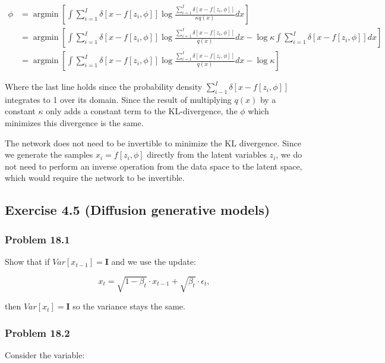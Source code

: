 \documentclass[
10pt, %
a4paper, %
oneside, %
headinclude,footinclude, %
BCOR5mm, %
]{scrartcl}
\DeclareMathOperator*{\argmin}{argmin} %
\begin{document}
\begin{align*}
  \phi &= \argmin \left[ \int \sum_{i=1}^I \delta[x-f[z_i,\phi]] \log \frac{\sum_{i=1}^I \delta[x-f[z_i,\phi]]}{\kappa q(x)} dx \right] \\
  &= \argmin \left[ \int \sum_{i=1}^I \delta[x-f[z_i,\phi]] \log \frac{\sum_{i=1}^I \delta[x-f[z_i,\phi]]}{q(x)} dx - \log \kappa \int \sum_{i=1}^I \delta[x-f[z_i,\phi]] dx \right] \\
  &= \argmin \left[ \int \sum_{i=1}^I \delta[x-f[z_i,\phi]] \log \frac{\sum_{i=1}^I \delta[x-f[z_i,\phi]]}{q(x)} dx - \log \kappa \right]
\end{align*}

Where the last line holds since the probability density $\sum_{i-1}^I \delta[x-f[z_i,\phi]]$ integrates to 1 over its domain. Since the result of multiplying $q(x)$ by a constant $\kappa$ only adds a constant term to the KL-divergence, the $\phi$ which minimizes this divergence is the same.

The network does not need to be invertible to minimize the KL divergence. Since we generate the samples $x_i = f[z_i , \phi]$ directly from the latent variables $z_i$, we do not need to perform an inverse operation from the data space to the latent space, which would require the network to be invertible.

\newpage

\subsection*{Exercise 4.5 (Diffusion generative models)}

\subsubsection*{Problem 18.1}

Show that if $Var[x_{t-1}] = \textbf{I}$ and we use the update:

\begin{equation*}
  x_t = \sqrt{1-\beta_t}\cdot x_{t-1} + \sqrt{\beta_t} \cdot \epsilon_t,
\end{equation*}

then $Var[x_t] = \textbf{I}$ so the variance stays the same.

\subsubsection*{Problem 18.2}

Consider the variable:
\end{document}
